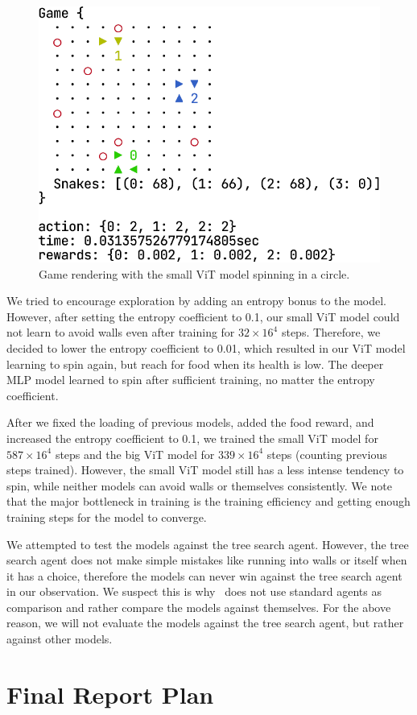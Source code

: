 \documentclass[conference]{IEEEtran}
\begin{document}
\begin{figure}
    \centering
    \includegraphics[width=0.4\linewidth]{vit_spin_render.png}
    \caption{Game rendering with the small ViT model spinning in a circle.
    }
    \label{fig:render}
\end{figure}

We tried to encourage exploration by adding an entropy bonus to the model.
However, after setting the entropy coefficient to 0.1,
our small ViT model could not learn to avoid walls even after training for
$32\times 16^4$ steps. Therefore,
we decided to lower the entropy coefficient to 0.01,
which resulted in our ViT model learning to spin again,
but reach for food when its health is low.
The deeper MLP model learned to spin after sufficient training,
no matter the entropy coefficient.

After we fixed the loading of previous models, added the food reward,
and increased the entropy coefficient to 0.1,
we trained the small ViT model for $587\times 16^4$ steps and the big ViT model
for $339\times 16^4$ steps (counting previous steps trained). However,
the small ViT model still has a less intense tendency to spin,
while neither models can avoid walls or themselves consistently.
We note that the major bottleneck in training is the training efficiency and
getting enough training steps for the model to converge.

We attempted to test the models against the tree search agent. However,
the tree search agent does not make simple mistakes like running into walls or
itself when it has a choice,
therefore the models can never win against the tree search agent in our
observation. We suspect this is why~\cite{chung2020battlesnake}
does not use standard agents as comparison and rather compare the models against
themselves. For the above reason,
we will not evaluate the models against the tree search agent,
but rather against other models.

\section{Final Report Plan}
\end{document}
